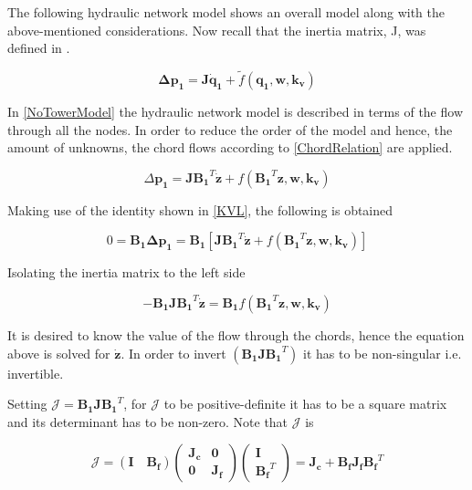The following hydraulic network model shows an overall model along with the above-mentioned considerations. 
Now recall that the inertia matrix, J, was defined in .

\begin{equation}
  \pmb{\Delta p_1} =  \pmb{J} \pmb{\dot{q}_1} + \tilde{f}(\pmb{q_1}, \pmb{w}, \pmb{k_v})
  \label{NoTowerModel}
\end{equation}

In \eqref{NoTowerModel} the hydraulic network model is described in terms of the 
flow through all the nodes. In order to reduce the order of the model and hence, 
the amount of unknowns, the chord flows according to \eqref{ChordRelation} are applied. 

\begin{equation}
  \Delta \pmb{p_1} =  \pmb{J} {\pmb{B_1}}^T \pmb{\dot{z}} + f({\pmb{B_1}}^T \pmb{z}, \pmb{w}, \pmb{k_v})
  \label{ChordsModel}
\end{equation}

Making use of the identity shown in \eqref{KVL}, the following is obtained

\begin{equation}
  0 = \pmb{B_1} \pmb{\Delta p_1} = \pmb{B_1} [ \pmb{J {B_1}}^T \pmb{\dot{z}} + f({\pmb{B_1}}^T \pmb{z}, \pmb{w}, \pmb{k_v})] 
 \end{equation}

Isolating the inertia matrix to the left side

\begin{equation}
 - \pmb{B_1} \pmb{J} \pmb{{B_1}}^T \pmb{\dot{z}}  = \pmb{B_1} f({\pmb{B_1}}^T \pmb{z}, \pmb{w}, \pmb{k_v})
 \label{isolateZ}
 \end{equation}

It is desired to know the value of the flow through the chords, hence the equation above is solved 
for $\pmb{\dot{z}}$. In order to invert $(\pmb{B_1 J} \pmb{{B_1}}^T)$ it has to be non-singular i.e. invertible. 

Setting $\pmb{\mathcal{J}} = \pmb{B_1 J} \pmb{{B_1}}^T $, for $\pmb{\mathcal{J}}$ to be positive-definite it has to be a square matrix and its 
determinant has to be non-zero. Note that $\pmb{\mathcal{J}}$ is

\begin{equation}
  \label{Jequation}
  \pmb{\mathcal{J}} = (\pmb{I \quad B_f}) 
  \begin{pmatrix}
    \pmb{J_c}    &    \pmb{0 }   \\
    \pmb{0}       &   \pmb{ J_f}
  \end{pmatrix}
  \begin{pmatrix}
    \pmb{I}    \\
    \pmb{{B_f}}^T
  \end{pmatrix}
  = \pmb{J_c} + \pmb{B_f J_f} \pmb{{B_f}}^T
\end{equation}

